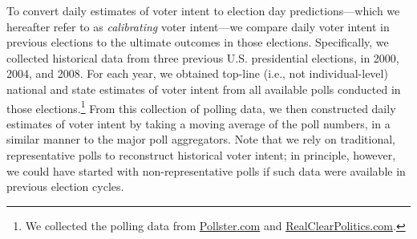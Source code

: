 \documentclass[preprint,authoryear,12pt]{elsarticle}
\begin{document}
To convert daily estimates of voter intent to election day predictions---which we hereafter refer
to as \emph{calibrating} voter intent---we compare daily voter intent in previous elections to
the ultimate outcomes in those elections.
Specifically, we collected historical data from three previous U.S.
presidential elections, in 2000, 2004, and 2008. For each year,
we obtained top-line (i.e., not individual-level) national and state estimates of
voter intent from all available polls conducted in those
elections.\footnote{We collected the polling
data from \url{Pollster.com} and \url{RealClearPolitics.com}.}
From this collection of polling data, we then constructed daily estimates of voter intent by taking a
moving average of the poll numbers, in a similar manner to the major poll aggregators.
Note that we rely on traditional, representative polls to reconstruct historical
voter intent; in principle, however, we could have started with non-representative polls if such data were available in previous
election cycles.

\end{document}
